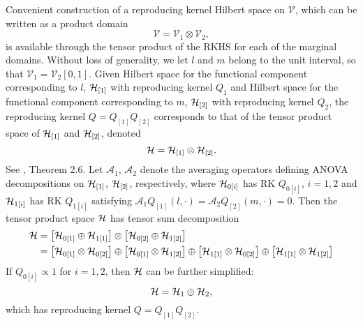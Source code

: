 Convenient construction of a reproducing kernel Hilbert space on $\mathcal{V}$, which can be written as a product domain
\[
\mathcal{V} = \mathcal{V}_1 \otimes \mathcal{V}_2,
\]
\noindent
is available through the tensor product of the RKHS for each of the marginal domains. Without loss of generality, we let $l$ and $m$ belong to the unit interval, so that $\mathcal{V}_1 = \mathcal{V}_2\left[0,1\right]$. Given Hilbert space for the functional component corresponding to $l$, $\mathcal{H}_{\left[1\right]}$ with reproducing kernel $Q_1$ and Hilbert space for the functional component corresponding to $m$, $\mathcal{H}_{\left[2\right]}$ with reproducing kernel $Q_2$, the reproducing kernel $Q = Q_{\left[1\right]}Q_{\left[2\right]}$ corresponds to that of the tensor product space of $\mathcal{H}_{\left[1\right]}$ and $\mathcal{H}_{\left[2\right]}$, denoted
\[
\mathcal{H} = \mathcal{H}_{\left[1\right]} \otimes \mathcal{H}_{\left[2\right]}.
\]
\noindent
See \cite{gu2002smoothing}, Theorem 2.6. Let $\mathcal{A}_1$, $\mathcal{A}_2$ denote the averaging operators defining ANOVA decompositions on $\mathcal{H}_{\left[1\right]}$, $\mathcal{H}_{\left[2\right]}$, respectively, where $\mathcal{H}_{0\left[i\right]}$ has RK $Q_{0\left[i\right]}$, $i = 1, 2$ and $\mathcal{H}_{1\left[i\right]}$ has RK $Q_{1\left[i\right]}$ satisfying $\mathcal{A}_1Q_{\left[1\right]}\left(l,\cdot\right) = \mathcal{A}_2Q_{\left[2\right]}\left(m,\cdot\right) = 0$. Then the tensor product space $\mathcal{H}$ has tensor sum decomposition
\begin{align} 
\begin{split} \label{eq:tensor-sum-decomposition}
\mathcal{H} &= \left[\mathcal{H}_{0\left[1\right]} \oplus \mathcal{H}_{1\left[1\right]} \right] \otimes \left[\mathcal{H}_{0\left[2\right]} \oplus \mathcal{H}_{1\left[2\right]} \right] \\
&= \left[\mathcal{H}_{0\left[1\right]} \otimes  \mathcal{H}_{0\left[2\right]}\right] \oplus \left[\mathcal{H}_{0\left[1\right]} \otimes \mathcal{H}_{1\left[2\right]}\right] \oplus \left[\mathcal{H}_{1\left[1\right]} \otimes  \mathcal{H}_{0\left[2\right]}\right] \oplus \left[\mathcal{H}_{1\left[1\right]} \otimes  \mathcal{H}_{1\left[2\right]}\right] 
\end{split}
\end{align}
\noindent
If $Q_{0\left[i\right]} \propto 1$ for $i = 1,2$, then $\mathcal{H}$ can be further simplified:
\begin{equation}
\mathcal{H} = \mathcal{H}_1 \oplus \mathcal{H}_2,
\end{equation}
\noindent
which has reproducing kernel $Q = Q_{\left[1\right]}Q_{\left[2\right]}$.

